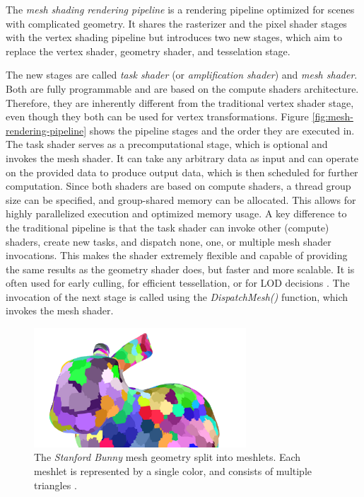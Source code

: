 \noindent
The \emph{mesh shading rendering pipeline} is a rendering pipeline optimized for scenes with complicated 
geometry. It shares the rasterizer and the pixel shader stages with the vertex shading pipeline but 
introduces two new stages, which aim to replace the vertex shader, geometry shader, and tesselation stage. \\
\enlargethispage{\baselineskip}

\noindent
The new stages are called \emph{task shader} (or \emph{amplification shader}) and \emph{mesh shader}. Both 
are fully programmable and are based on the compute shaders architecture. Therefore, they are inherently 
different from the traditional vertex shader stage, even though they both can be used for vertex 
transformations. Figure \ref{fig:mesh-rendering-pipeline} shows the pipeline stages and the order they are 
executed in. \\

\noindent
The task shader serves as a precomputational stage, which is optional and invokes the mesh shader. It can 
take any arbitrary data as input and can operate on the provided data to produce output data, which is then 
scheduled for further computation. Since both shaders are based on compute shaders, a thread group size can 
be specified, and group-shared memory can be allocated. This allows for highly parallelized execution and 
optimized memory usage. A key difference to the traditional pipeline is that the task shader can invoke other 
(compute) shaders, create new tasks, and dispatch none, one, or multiple mesh shader invocations. This makes 
the shader extremely flexible and capable of providing the same results as the geometry shader does, but 
faster and more scalable. It is often used for early culling, for efficient tessellation, or for \ac{LOD} 
decisions \cite{Kubisch2018}. The invocation of the next stage is called using the \emph{DispatchMesh()} 
function, which invokes the mesh shader. \\

\begin{figure}[h]
    \centering
    \includegraphics[width=300px]{images/graphics/bunny-meshlet.jpg}
    \caption{The \emph{Stanford Bunny} mesh geometry split into meshlets. Each meshlet is represented by a single color, 
    and consists of multiple triangles \cite{Oberberger2024}.}
    \label{fig:bunny-meshlet}
\end{figure}

